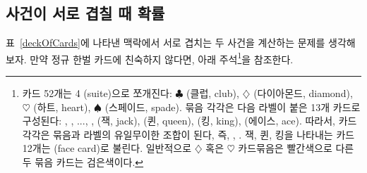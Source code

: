 
\subsection{사건이 서로 겹칠 때 확률}

표~\ref{deckOfCards}에 나타낸  맥락에서 서로 겹치는 두 사건을 계산하는 문제를 생각해 보자. 만약 정규 한벌 카드에 친숙하지 않다면, 아래 주석\footnote{카드 52개는 4 (suite)으로 쪼개진다: $\clubsuit$ (클럽, club), {\color{redcards}$\diamondsuit$} (다이아몬드, diamond), {\color{redcards}$\heartsuit$} (하트, heart), $\spadesuit$ (스페이드, spade). 묶음 각각은 다음 라벨이 붙은 13개 카드로 구성된다: , , ..., ,  (잭, jack),  (퀸, queen),  (킹, king),  (에이스, ace). 따라서, 카드 각각은 묶음과 라벨의 유일무이한 조합이 된다, 즉, {\color{redcards}}, . 잭, 퀸, 킹을 나타내는 카드 12개는 (face card)로 불린다. 일반적으로 {\color{redcards}$\diamondsuit$} 혹은 {\color{redcards}$\heartsuit$} 카드묶음은 {\color{redcards}빨간색}으로 다른 두 묶음 카드는 검은색이다.}을 참조한다.


